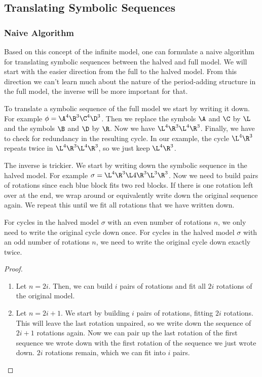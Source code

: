 \subsection{Translating Symbolic Sequences}



\subsubsection{Naive Algorithm}

Based on this concept of the infinite model, one can formulate a naive algorithm for translating symbolic sequences between the halved and full model.
We will start with the easier direction from the full to the halved model.
From this direction we can't learn much about the nature of the period-adding structure in the full model, the inverse will be more important for that.

To translate a symbolic sequence of the full model we start by writing it down.
For example $\phi = \A^4\B^3\C^4\D^3$.
Then we replace the symbols $\A$ and $\C$ by $\L$ and the symbols $\B$ and $\D$ by $\R$.
Now we have $\L^4\R^3\L^4\R^3$.
Finally, we have to check for redundancy in the resulting cycle.
In our example, the cycle $\L^4\R^3$ repeats twice in $\L^4\R^3\L^4\R^3$, so we just keep $\L^4\R^3$.

The inverse is trickier.
We start by writing down the symbolic sequence in the halved model.
For example $\sigma = \L^4\R^3\L4\R^3\L^3\R^3$.
Now we need to build pairs of rotations since each blue block fits two red blocks.
If there is one rotation left over at the end, we wrap around or equivalently write down the original sequence again.
We repeat this until we fit all rotations that we have written down.

\begin{lemma}
	\label{lemma:writing.down}
	For cycles in the halved model $\sigma$ with an even number of rotations $n$, we only need to write the original cycle down once.
	For cycles in the halved model $\sigma$ with an odd number of rotations $n$, we need to write the original cycle down exactly twice.
\end{lemma}

\begin{proof} \phantom{x}
	\begin{enumerate}
		\item Let $n = 2i$. Then, we can build $i$ pairs of rotations and fit all $2i$ rotations of the original model.
		\item Let $n = 2i + 1$. We start by building $i$ pairs of rotations, fitting $2i$ rotations.
		      This will leave the last rotation unpaired, so we write down the sequence of $2i + 1$ rotations again.
		      Now we can pair up the last rotation of the first sequence we wrote down with the first rotation of the sequence we just wrote down.
		      $2i$ rotations remain, which we can fit into $i$ pairs.
	\end{enumerate}
\end{proof}

